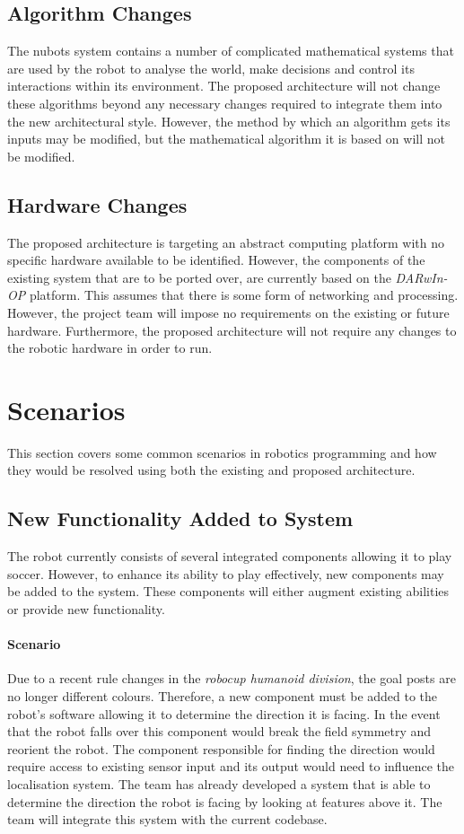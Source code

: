 \documentclass[english,12pt]{scrartcl}
\begin{document}
		\subsection{Algorithm Changes}
			The \gls{nubots} system contains a number of complicated mathematical systems that are used by the robot to analyse the world, make decisions and control its interactions within its environment. 
			The proposed architecture will not change these algorithms beyond any necessary changes required to integrate them into the new architectural style.
			However, the method by which an algorithm gets its inputs may be modified, but the mathematical algorithm it is based on will not be modified.
			
		\subsection{Hardware Changes}
			The proposed architecture is targeting an abstract computing platform with no specific hardware available to be identified.
			However, the components of the existing system that are to be ported over, are currently based on the \emph{DARwIn-OP} platform.
			This assumes that there is some form of networking and processing.
			However, the project team will impose no requirements on the existing or future hardware.
			Furthermore, the proposed architecture will not require any changes to the robotic hardware in order to run.

	\section{Scenarios}
		This section covers some common scenarios in robotics programming and how they would be resolved 
		using both the existing and proposed architecture.

		\subsection{New Functionality Added to System}
			The robot currently consists of several integrated components allowing it to play soccer.
			However, to enhance its ability to play effectively, new components may be added to the system.
			These components will either augment existing abilities or provide new functionality.

			\paragraph{Scenario} Due to a recent rule changes in the 
			\emph{\gls{robocup} humanoid division}, the goal posts are no longer different colours.
			Therefore, a new component must be added to the robot's software allowing it to determine the direction it is facing.
			In the event that the robot falls over this component would break the field symmetry and reorient the robot.
			The component responsible for finding the direction would require access to existing sensor input and its output would need to influence the localisation system.
			The team has already developed a system that is able to determine the direction the robot is facing by looking at features above it.
			The team will integrate this system with the current codebase.
\end{document}
